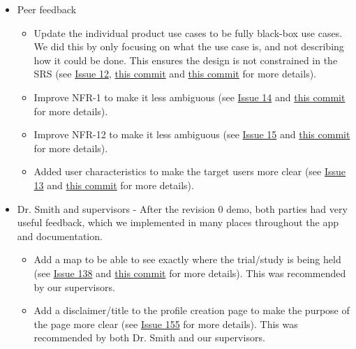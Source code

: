 \documentclass{article}
\begin{document}
\begin{itemize}
    \item Peer feedback
          \begin{itemize}
              \item Update the individual product use cases to be fully black-box use cases. We did this by only focusing on what the use case is, and not describing how it could be done. This ensures the design is not constrained in the SRS (see \href{https://github.com/davimang/REACH/issues/12}{Issue 12}, \href{https://github.com/davimang/REACH/commit/7b80cb5d97721e50163f8874ba8e1d98c0bc45f9}{this commit} and \href{https://github.com/davimang/REACH/commit/916252afc158618ca8039c603c2f46ad836c0947}{this commit} for more details).
              \item Improve NFR-1 to make it less ambiguous (see \href{https://github.com/davimang/REACH/issues/14}{Issue 14} and \href{https://github.com/davimang/REACH/commit/6e514cf91ae0eae4c481530bf3403c99eb11770b}{this commit} for more details).
              \item Improve NFR-12 to make it less ambiguous (see \href{https://github.com/davimang/REACH/issues/15}{Issue 15} and \href{https://github.com/davimang/REACH/commit/6e514cf91ae0eae4c481530bf3403c99eb11770b}{this commit} for more details).
              \item Added user characteristics to make the target users more clear (see \href{https://github.com/davimang/REACH/issues/13}{Issue 13} and \href{https://github.com/davimang/REACH/commit/80c3ac1591a79c1b5f9850462cc52d9fbc6672e5}{this commit} for more details).
          \end{itemize}
    \item Dr. Smith and supervisors - After the revision 0 demo, both parties had very useful feedback, which we implemented in many places throughout the app and documentation.
          \begin{itemize}
              \item Add a map to be able to see exactly where the trial/study is being held (see \href{https://github.com/davimang/REACH/issues/138}{Issue 138} and \href{https://github.com/davimang/REACH/commit/8b6dd42a8c4585f0ac4a0efce1ea32024c65f6c0}{this commit} for more details). This was recommended by our supervisors.
              \item Add a disclaimer/title to the profile creation page to make the purpose of the page more clear (see \href{https://github.com/davimang/REACH/issues/155}{Issue 155} for more details). This was recommended by both Dr. Smith and our supervisors.

\end{itemize}
\end{itemize}
\end{document}
